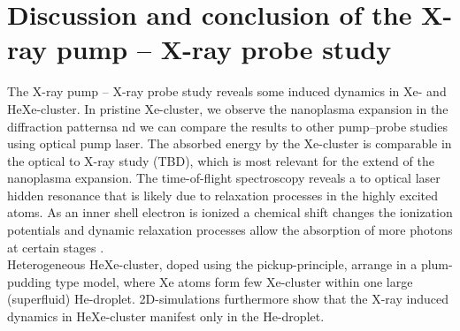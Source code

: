 %
%
%
%
%
%
%
%
%
%
%
%
\section{Discussion and conclusion of the X-ray pump -- X-ray probe study}
The X-ray pump -- X-ray probe study reveals some induced dynamics in Xe- and HeXe-cluster. In pristine Xe-cluster, we observe the nanoplasma expansion in the diffraction patternsa nd we can compare the results to other pump--probe studies using optical pump laser. The absorbed energy by the Xe-cluster is comparable in the optical to X-ray study (TBD), which is most relevant for the extend of the nanoplasma expansion. The time-of-flight spectroscopy reveals a to optical laser hidden resonance that is likely due to relaxation processes in the highly excited atoms. As an inner shell electron is ionized a chemical shift changes the ionization potentials and dynamic relaxation processes allow the absorption of more photons at certain stages \citep{Ho-2014-PRL}.\\
Heterogeneous HeXe-cluster, doped using the pickup-principle, arrange in a plum-pudding type model, where Xe atoms form few Xe-cluster within one large (superfluid) He-droplet. 2D-simulations furthermore show that the X-ray induced dynamics in HeXe-cluster manifest only in the He-droplet.
%
%
%